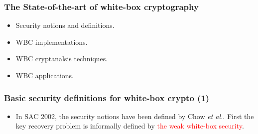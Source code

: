\documentclass{beamer}
\begin{document}
\frame
{
\frametitle{The State-of-the-art of white-box cryptography}
\begin{itemize}
\setlength{\itemsep}{12pt}
\item Security notions and definitions.

\item WBC implementations.

\item WBC cryptanalsis techniques.

\item WBC applications.

\end{itemize}
}

\frame
{
\frametitle{Basic security definitions for white-box crypto (1)}
\begin{itemize}
\item In SAC 2002, the security notions have been defined by Chow \textit{et al.}. First the key recovery problem is informally defined by \textcolor{red}{the weak white-box security}.
\end{itemize}


\begin{center}
\end{center}
}
\end{document}

